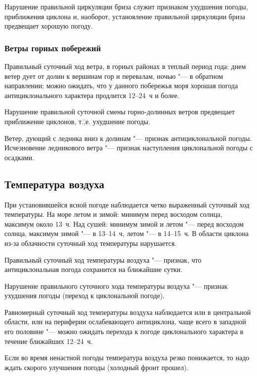  Нарушение правильной циркуляции бриза служит признаком
ухудшения погоды, приближения циклона и, наоборот, установление
правильной циркуляции бриза предвещает хорошую погоду.

\subsubsection{Ветры горных побережий}

 Правильный суточный ход ветра, в горных районах в теплый
период года: днем ветер дует от долин к вершинам гор и перевалам,
ночью "--- в обратном направлении; можно ожидать, что у данного побережья
моря хорошая погода антициклонального характера продлится 12--24~ч и
более.

 Нарушение правильной суточной смены горно-долинных ветров
предвещает приближение циклонов, т.\=,е. ухудшение погоды.

 Ветер, дующий с ледника вниз к долинам "--- признак антициклональной
погоды. Исчезновение ледникового ветра "--- признак наступления
циклональной погоды с осадками.

\subsection{Температура воздуха}

При установившейся ясной погоде наблюдается четко выраженный суточный
ход температуры. На море летом и зимой: минимум перед восходом солнца,
максимум около 13~ч. Над сушей: минимум зимой и летом "--- перед восходом
солнца, максимум зимой "--- в 13--14~ч, летом "--- в 14--15~ч. В области
циклона из-за облачности суточный ход температуры нарушается.

 Правильный суточный ход температуры воздуха "--- признак, что
антициклональная погода сохранится на ближайшие сутки.

 Нарушение правильного суточного хода температуры воздуха "---
признак ухудшения погоды (переход к циклональной погоде).

 Равномерный суточный ход температуры воздуха наблюдается или в
центральной области, или на периферии ослабевающего антициклона, чаще
всего в западной его половине "--- можно ожидать перехода к погоде
циклонального характера в течение ближайших 12--24~ч.

 Если во время ненастной погоды температура воздуха резко
понижается, то надо ждать скорого улучшения погоды (холодный фронт
прошел).

